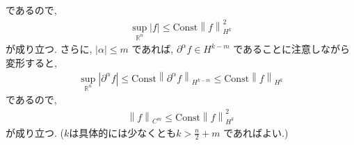 \documentclass[10pt, fleqn, label-section=none]{bxjsarticle}
\theoremstyle{definition}
\newcommand{\abs}[1]{\left|#1\right|}
\newcommand{\norm}[1]{\left\|#1\right\|}
\newcommand{\Const}{\textrm{Const}}
\renewcommand{\;}{\, ; \,}
\begin{document}
であるので, 
\begin{align*} \sup_{\mathbb R^n} \abs{f} \leq \Const \norm{f}^2_{H^k } \end{align*}
が成り立つ. さらに, $\abs \alpha \leq m $ であれば, $\partial^\alpha f \in H^{k-m}$ であることに注意しながら変形すると, 
\begin{align*} \sup_{\mathbb R^n} \abs{\partial ^\alpha f} \leq \Const \norm{\partial ^\alpha f}_{H^{k-m} } \leq  \Const \norm{f}_{H^k }  \end{align*}
であるので, 
\begin{align*} \norm{f}_{C^m} \leq \Const \norm{f}^2_{H^k}\end{align*}
が成り立つ. ($k$は具体的には少なくとも$k > \frac{n}{2} + m$ であればよい.)
\end{document}
